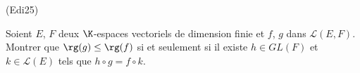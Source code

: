 \begin{tiny}(Edi25)\end{tiny} Soient $E$, $F$ deux $\K$-espaces vectoriels de dimension finie et $f$, $g$ dans $\mathcal{L}(E,F)$. Montrer que $\rg(g) \leq \rg(f)$ si et seulement si il existe $h\in GL(F)$ et $k\in \mathcal{L}(E)$ tels que $h \circ g = f \circ k$.